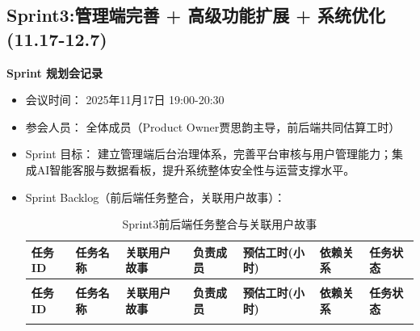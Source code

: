\subsection{Sprint3:管理端完善 + 高级功能扩展 + 系统优化(11.17-12.7)}

\begin{levellist}
    \item \textbf{Sprint 规划会记录}
    \begin{itemize}
        \item 会议时间： 2025年11月17日 19:00-20:30
        \item 参会人员： 全体成员（Product Owner贾思韵主导，前后端共同估算工时）
        \item Sprint 目标： 建立管理端后台治理体系，完善平台审核与用户管理能力；集成AI智能客服与数据看板，提升系统整体安全性与运营支撑水平。
        \item Sprint Backlog（前后端任务整合，关联用户故事）：


              \begin{longtable}{>{\centering\arraybackslash}m{1.4cm} >{\centering\arraybackslash}m{3.1cm} >{\centering\arraybackslash}m{1.7cm} >{\centering\arraybackslash}m{1.8cm} >{\centering\arraybackslash}m{1.8cm} >{\centering\arraybackslash}m{1.3cm} >{\centering\arraybackslash}m{1.2cm}}

                  \caption{Sprint3前后端任务整合与关联用户故事} \label{tab:training}                                                                                                  \\

                  \toprule
                  \textbf{任务ID} & \textbf{任务名称}                & \textbf{关联用户故事}     & \textbf{负责成员} & \textbf{预估工时(小时)} & \textbf{依赖关系}                & \textbf{任务状态} \\
                  \midrule
                  \endfirsthead

                  \multicolumn{7}{c}{{\tablename\ \thetable{} 续表}}                                                                                                      \\
                  \toprule
                  \textbf{任务ID} & \textbf{任务名称}                & \textbf{关联用户故事}     & \textbf{负责成员} & \textbf{预估工时(小时)} & \textbf{依赖关系}                & \textbf{任务状态} \\
                  \midrule
                  \endhead

                  \bottomrule
                  \endfoot



\end{longtable}
\end{itemize}
\end{levellist}
